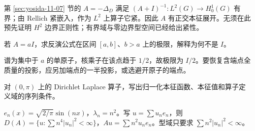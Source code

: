 \begin{example}
第 \ref{sec:yosida-11-07} 节的 $A=-\Delta_D$ 满足 $(A+I)^{-1}:L^2(G)\to H_0^1(G)$ 有界；由 Rellich 紧嵌入，作为 $L^2$ 上算子它紧。因此 $A$ 有正交本征展开。无须在此预先证明 $H^2$ 边界正则性；有界域与零边界型空间已经给出紧性。
\end{example}

\begin{exercise}[端点半质量]\label{ex:y11-stone-endpoints}
若 $A=aI$，求反演公式在区间 $[a,b]$、$b>a$ 上的极限，解释为何不是 $I$。
\end{exercise}
\begin{solution}
谱为集中于 $a$ 的单原子，核乘子在该点趋于 $1/2$，故极限为 $I/2$。要恢复含端点全质量的投影，应另加端点的一半投影，或选避开原子的端点。
\end{solution}

\begin{exercise}[一维本征展开]\label{ex:y11-dirichlet-basis}
对 $(0,\pi)$ 上的 Dirichlet Laplace 算子，写出归一化本征函数、本征值和算子定义域的序列条件。
\end{exercise}
\begin{solution}
$e_n(x)=\sqrt{2/\pi}\sin(nx)$，$\lambda_n=n^2$。写 $u=\sum u_ne_n$，则 $D(A)=\{u:\sum n^4|u_n|^2<\infty\}$，$Au=\sum n^2u_ne_n$。型域只要求 $\sum n^2|u_n|^2<\infty$。
\end{solution}
